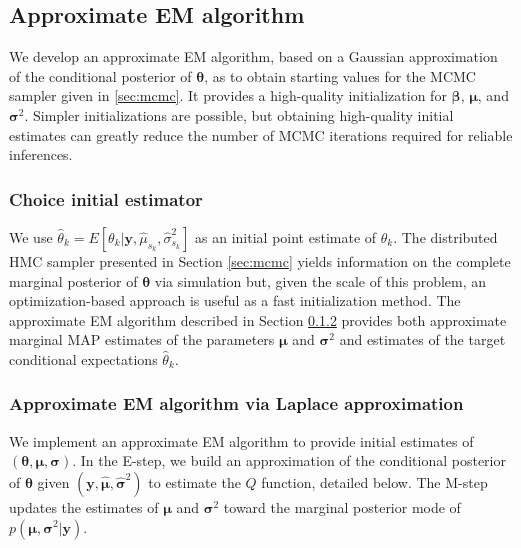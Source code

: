 \documentclass[12pt]{article}
\begin{document}
\subsection{Approximate EM algorithm}
\label{sec:approxem}

We develop an approximate EM algorithm, based on a Gaussian approximation of the conditional posterior of $\bm \theta$, as to obtain starting values for the MCMC sampler given in \ref{sec:mcmc}.
It provides a high-quality initialization for $\bm \beta$, $\bm \mu$, and $\bm \sigma^2$.
Simpler initializations are possible, but obtaining high-quality initial estimates can greatly reduce the number of MCMC iterations required for reliable inferences.

\subsubsection{Choice initial estimator}
\label{sec:objective}

We use $\hat \theta_k = E \left[ \theta_k | \bm y, \hat \mu_{s_k}, \hat \sigma^2_{s_k} \right]$ as an initial point estimate of $\theta_k$.
The distributed HMC sampler presented in Section \ref{sec:mcmc} yields information on the complete marginal posterior of $\bm \theta$ via simulation but, given the scale of this problem, an optimization-based approach is useful as a fast initialization method.
The approximate EM algorithm described in Section \ref{sec:approximate_em} provides both approximate marginal MAP estimates of the parameters $\bm \mu$ and $\bm \sigma^2$ and estimates of the target conditional expectations $\hat \theta_k$.

\subsubsection{Approximate EM algorithm via Laplace approximation}
\label{sec:approximate_em}

We implement an approximate EM algorithm to provide initial estimates of $(\bm \theta, \bm \mu, \bm \sigma)$.
In the E-step, we build an approximation of the conditional posterior of ${\bm \theta}$ given $(\bm y, \hat {\bm\mu}, \hat{\bm\sigma}^2)$ to estimate the $Q$ function, detailed below.
The M-step updates the estimates of $\bm \mu$ and $\bm \sigma^2$ toward the marginal posterior mode of $p(\bm \mu, \bm \sigma^2 | \bm y)$.
\end{document}
